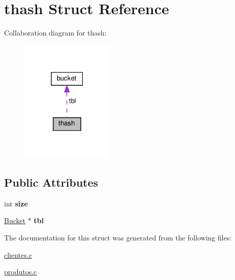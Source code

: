 \hypertarget{structthash}{}\section{thash Struct Reference}
\label{structthash}


Collaboration diagram for thash\+:
\nopagebreak
\begin{figure}[H]
\begin{center}
\leavevmode
\includegraphics[width=126pt]{structthash__coll__graph}
\end{center}
\end{figure}
\subsection*{Public Attributes}
\begin{DoxyCompactItemize}
\item 
\mbox{\label{structthash_a1ab8265f26cdd44c63cc812b0b56dab5}} 
int {\bfseries size}
\item 
\mbox{\label{structthash_aaf099d908ffbfc2d8ad138e2a3af94e8}} 
\hyperlink{structbucket}{Bucket} $\ast$ {\bfseries tbl}
\end{DoxyCompactItemize}


The documentation for this struct was generated from the following files\+:\begin{DoxyCompactItemize}
\item 
\hyperlink{clientes_8c}{clientes.\+c}\item 
\hyperlink{produtos_8c}{produtos.\+c}\end{DoxyCompactItemize}

